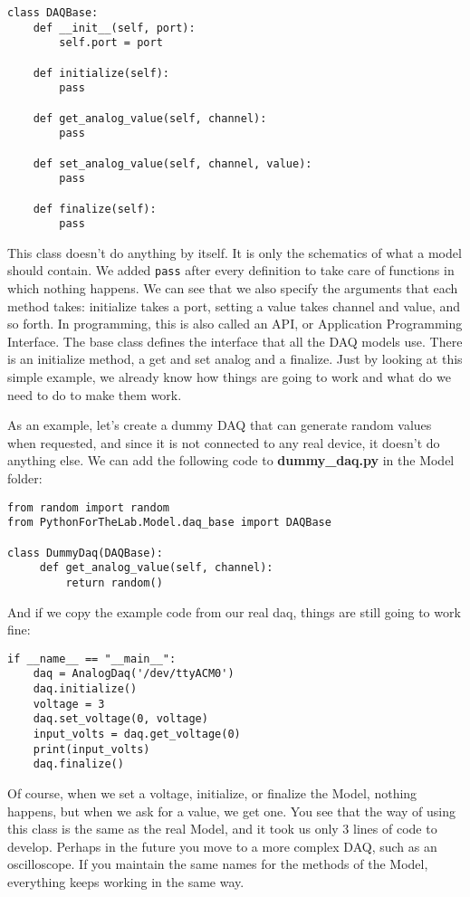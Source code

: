 \begin{verbatim}
class DAQBase:
    def __init__(self, port):
        self.port = port

    def initialize(self):
        pass

    def get_analog_value(self, channel):
        pass

    def set_analog_value(self, channel, value):
        pass

    def finalize(self):
        pass
\end{verbatim}

This class doesn't do anything by itself. It is only the schematics of what a model should contain. We added \texttt{pass} after every definition to take care of functions in which nothing happens. We can see that we also specify the arguments that each method takes: initialize takes a port, setting a value takes channel and value, and so forth. In programming, this is also called an API, or Application Programming Interface. The base class defines the interface that all the DAQ models use. There is an initialize method, a get and set analog and a finalize. Just by looking at this simple example, we already know how things are going to work and what do we need to do to make them work.

As an example, let's create a dummy DAQ that can generate random values when requested, and since it is not connected to any real device, it doesn't do anything else. We can add the following code to \textbf{dummy\_daq.py} in the Model folder:

\begin{verbatim}
from random import random
from PythonForTheLab.Model.daq_base import DAQBase

class DummyDaq(DAQBase):
     def get_analog_value(self, channel):
         return random()
\end{verbatim}

And if we copy the example code from our real daq, things are still going to work fine:

\begin{verbatim}
if __name__ == "__main__":
    daq = AnalogDaq('/dev/ttyACM0')
    daq.initialize()
    voltage = 3
    daq.set_voltage(0, voltage)
    input_volts = daq.get_voltage(0)
    print(input_volts)
    daq.finalize()
\end{verbatim}

Of course, when we set a voltage, initialize, or finalize the Model, nothing happens, but when we ask for a value, we get one. You see that the way of using this class is the same as the real Model, and it took us only 3 lines of code to develop. Perhaps in the future you move to a more complex DAQ, such as an oscilloscope. If you maintain the same names for the methods of the Model, everything keeps working in the same way.

